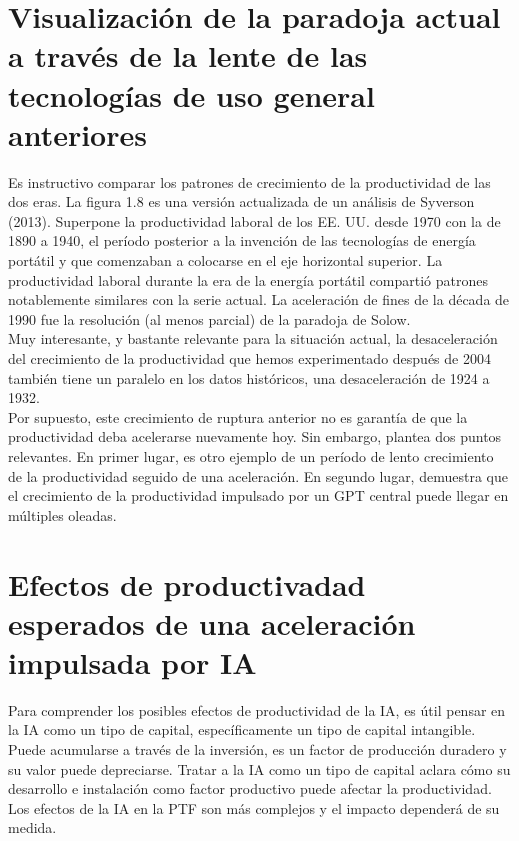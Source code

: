 \section{Visualización de la paradoja actual a través de la lente de las tecnologías de uso general anteriores}
Es instructivo comparar los patrones de crecimiento de la productividad de las dos eras. La figura 1.8 es una versión actualizada de un análisis de Syverson (2013). Superpone la productividad laboral de los EE. UU. desde 1970 con la de 1890 a 1940, el período posterior a la invención de las tecnologías de energía portátil y que comenzaban a colocarse en el eje horizontal superior. La productividad laboral durante la era de la energía portátil compartió patrones notablemente similares con la serie actual. La aceleración de fines de la década de 1990 fue la resolución (al menos parcial) de la paradoja de Solow.\\
Muy interesante, y bastante relevante para la situación actual, la desaceleración del crecimiento de la productividad que hemos experimentado después de 2004 también tiene un paralelo en los datos históricos, una desaceleración de 1924 a 1932.\\
Por supuesto, este crecimiento de ruptura anterior no es garantía de que la productividad deba acelerarse nuevamente hoy. Sin embargo, plantea dos puntos relevantes. En primer lugar, es otro ejemplo de un período de lento crecimiento de la productividad seguido de una aceleración. En segundo lugar, demuestra que el crecimiento de la productividad impulsado por un GPT central puede llegar en múltiples oleadas.

\section{Efectos de productivadad esperados de una aceleración impulsada por IA}
Para comprender los posibles efectos de productividad de la IA, es útil pensar en la IA como un tipo de capital, específicamente un tipo de capital intangible. Puede acumularse a través de la inversión, es un factor de producción duradero y su valor puede depreciarse. Tratar a la IA como un tipo de capital aclara cómo su desarrollo e instalación como factor productivo puede afectar la productividad.\\
Los efectos de la IA en la PTF son más complejos y el impacto  dependerá de su medida.

